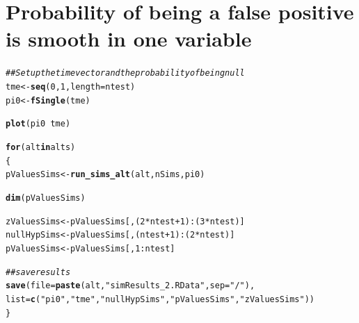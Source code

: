 \documentclass{article}\usepackage[]{graphicx}\usepackage[]{color}
\makeatletter
\newcommand{\hlnum}[1]{\textcolor[rgb]{0.686,0.059,0.569}{#1}}%
\newcommand{\hlstr}[1]{\textcolor[rgb]{0.192,0.494,0.8}{#1}}%
\newcommand{\hlcom}[1]{\textcolor[rgb]{0.678,0.584,0.686}{\textit{#1}}}%
\newcommand{\hlopt}[1]{\textcolor[rgb]{0,0,0}{#1}}%
\newcommand{\hlstd}[1]{\textcolor[rgb]{0.345,0.345,0.345}{#1}}%
\newcommand{\hlkwa}[1]{\textcolor[rgb]{0.161,0.373,0.58}{\textbf{#1}}}%
\newcommand{\hlkwb}[1]{\textcolor[rgb]{0.69,0.353,0.396}{#1}}%
\newcommand{\hlkwc}[1]{\textcolor[rgb]{0.333,0.667,0.333}{#1}}%
\newcommand{\hlkwd}[1]{\textcolor[rgb]{0.737,0.353,0.396}{\textbf{#1}}}%
\newenvironment{kframe}{%
 \def\at@end@of@kframe{}%
 \ifinner\ifhmode%
  \def\at@end@of@kframe{\end{minipage}}%
  \begin{minipage}{\columnwidth}%
 \fi\fi%
 \def\FrameCommand##1{\hskip\@totalleftmargin \hskip-\fboxsep
 \colorbox{shadecolor}{##1}\hskip-\fboxsep
     \hskip-\linewidth \hskip-\@totalleftmargin \hskip\columnwidth}%
 \MakeFramed {\advance\hsize-\width
   \@totalleftmargin\z@ \linewidth\hsize
   \@setminipage}}%
 {\par\unskip\endMakeFramed%
 \at@end@of@kframe}
\newenvironment{knitrout}{}{} %
\makeatother
\begin{document}
\section{Probability of being a false positive is smooth in one variable}

\begin{knitrout}
\color{fgcolor}\begin{kframe}
\begin{alltt}
\hlcom{## Set up the time vector and the probability of being null}
\hlstd{tme} \hlkwb{<-} \hlkwd{seq}\hlstd{(}\hlnum{0}\hlstd{,}\hlnum{1}\hlstd{,} \hlkwc{length}\hlstd{=ntest)}
\hlstd{pi0} \hlkwb{<-} \hlkwd{fSingle}\hlstd{(tme)}

\hlkwd{plot}\hlstd{(pi0} \hlopt{~} \hlstd{tme)}

\hlkwa{for}\hlstd{(alt} \hlkwa{in} \hlstd{alts)}
\hlstd{\{}
  \hlstd{pValuesSims} \hlkwb{<-} \hlkwd{run_sims_alt}\hlstd{(alt, nSims, pi0)}

  \hlkwd{dim}\hlstd{(pValuesSims)}

  \hlstd{zValuesSims} \hlkwb{<-} \hlstd{pValuesSims[,(}\hlnum{2}\hlopt{*}\hlstd{ntest}\hlopt{+}\hlnum{1}\hlstd{)}\hlopt{:}\hlstd{(}\hlnum{3}\hlopt{*}\hlstd{ntest)]}
  \hlstd{nullHypSims} \hlkwb{<-} \hlstd{pValuesSims[,(ntest}\hlopt{+}\hlnum{1}\hlstd{)}\hlopt{:}\hlstd{(}\hlnum{2}\hlopt{*}\hlstd{ntest)]}
  \hlstd{pValuesSims} \hlkwb{<-} \hlstd{pValuesSims[,}\hlnum{1}\hlopt{:}\hlstd{ntest]}

  \hlcom{##save results}
  \hlkwd{save}\hlstd{(}\hlkwc{file}\hlstd{=}\hlkwd{paste}\hlstd{(alt,} \hlstr{"simResults_2.RData"}\hlstd{,}\hlkwc{sep}\hlstd{=}\hlstr{"/"}\hlstd{),}
       \hlkwc{list}\hlstd{=}\hlkwd{c}\hlstd{(}\hlstr{"pi0"}\hlstd{,} \hlstr{"tme"}\hlstd{,} \hlstr{"nullHypSims"}\hlstd{,}\hlstr{"pValuesSims"}\hlstd{,}\hlstr{"zValuesSims"}\hlstd{))}
\hlstd{\}}
\end{alltt}
\end{kframe}


\end{knitrout}
\end{document}
